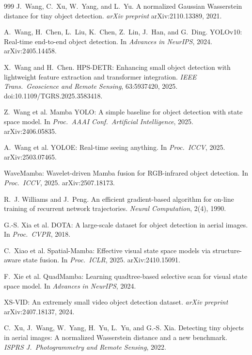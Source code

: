 \begin{thebibliography}{999}
J.~Wang, C.~Xu, W.~Yang, and L.~Yu.
A normalized Gaussian Wasserstein distance for tiny object detection.
\textit{arXiv preprint} arXiv:2110.13389, 2021.

A.~Wang, H.~Chen, L.~Liu, K.~Chen, Z.~Lin, J.~Han, and G.~Ding.
YOLOv10: Real-time end-to-end object detection.
In \textit{Advances in NeurIPS}, 2024. arXiv:2405.14458.

X.~Wang and H.~Chen.
HPS-DETR: Enhancing small object detection with lightweight feature
extraction and transformer integration.
\textit{IEEE Trans.\ Geoscience and Remote Sensing}, 63:5937420, 2025.
doi:10.1109/TGRS.2025.3583418.

Z.~Wang et al.
Mamba YOLO: A simple baseline for object detection with state space model.
In \textit{Proc.\ AAAI Conf.\ Artificial Intelligence}, 2025. arXiv:2406.05835.

A.~Wang et al.
YOLOE: Real-time seeing anything.
In \textit{Proc.\ ICCV}, 2025. arXiv:2503.07465.

WaveMamba: Wavelet-driven Mamba fusion for RGB-infrared object detection.
In \textit{Proc.\ ICCV}, 2025. arXiv:2507.18173.

R.~J. Williams and J.~Peng.
An efficient gradient-based algorithm for on-line training of recurrent
network trajectories. \textit{Neural Computation}, 2(4), 1990.

G.-S. Xia et al.
DOTA: A large-scale dataset for object detection in aerial images.
In \textit{Proc.\ CVPR}, 2018.

C.~Xiao et al.
Spatial-Mamba: Effective visual state space models via structure-aware state
fusion. In \textit{Proc.\ ICLR}, 2025. arXiv:2410.15091.

F.~Xie et al.
QuadMamba: Learning quadtree-based selective scan for visual state space model.
In \textit{Advances in NeurIPS}, 2024.

XS-VID: An extremely small video object detection dataset.
\textit{arXiv preprint} arXiv:2407.18137, 2024.

C.~Xu, J.~Wang, W.~Yang, H.~Yu, L.~Yu, and G.-S. Xia.
Detecting tiny objects in aerial images: A normalized Wasserstein distance and
a new benchmark. \textit{ISPRS J.\ Photogrammetry and Remote Sensing}, 2022.


\end{thebibliography}
